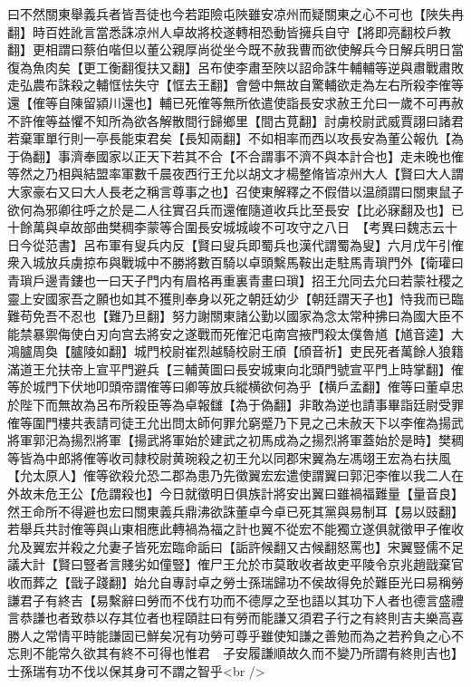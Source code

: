 曰不然關東舉義兵者皆吾徒也今若距險屯陜雖安凉州而疑關東之心不可也【陜失冉翻】時百姓訛言當悉誅凉州人卓故將校遂轉相恐動皆擁兵自守【將即亮翻校戶教翻】更相謂曰蔡伯喈但以董公親厚尚從坐今既不赦我曹而欲使解兵今日解兵明日當復為魚肉矣【更工衡翻復扶又翻】呂布使李肅至陜以詔命誅牛輔輔等逆與肅戰肅敗走弘農布誅殺之輔恇怯失守【恇去王翻】會營中無故自驚輔欲走為左右所殺李傕等還【傕等自陳留潁川還也】輔已死傕等無所依遣使詣長安求赦王允曰一歲不可再赦不許傕等益懼不知所為欲各解散間行歸鄉里【間古莧翻】討虜校尉武威賈詡曰諸君若棄軍單行則一亭長能束君矣【長知兩翻】不如相率而西以攻長安為董公報仇【為于偽翻】事濟奉國家以正天下若其不合【不合謂事不濟不與本計合也】走未晚也傕等然之乃相與結盟率軍數千晨夜西行王允以胡文才楊整脩皆凉州大人【賢曰大人謂大家豪右又曰大人長老之稱言尊事之也】召使東解釋之不假借以温顔謂曰關東鼠子欲何為邪卿往呼之於是二人往實召兵而還傕隨道收兵比至長安【比必寐翻及也】已十餘萬與卓故部曲樊稠李蒙等合圍長安城城峻不可攻守之八日　【考異曰魏志云十日今從范書】呂布軍有叟兵内反【賢曰叟兵即蜀兵也漢代謂蜀為叟】六月戊午引傕衆入城放兵虜掠布與戰城中不勝將數百騎以卓頭繫馬鞍出走駐馬青瑣門外【衛瓘曰青瑣戶邊青鏤也一曰天子門内有眉格再重裏青畫曰瑣】招王允同去允曰若蒙社稷之靈上安國家吾之願也如其不獲則奉身以死之朝廷幼少【朝廷謂天子也】恃我而已臨難苟免吾不忍也【難乃旦翻】努力謝關東諸公勤以國家為念太常种拂曰為國大臣不能禁暴禦侮使白刃向宫去將安之遂戰而死傕汜屯南宫掖門殺太僕魯馗【馗音逵】大鴻臚周奐【臚陵如翻】城門校尉崔烈越騎校尉王頎【頎音祈】吏民死者萬餘人狼籍滿道王允扶帝上宣平門避兵【三輔黄圖曰長安城東向北頭門號宣平門上時掌翻】傕等於城門下伏地叩頭帝謂傕等曰卿等放兵縱横欲何為乎【横戶孟翻】傕等曰董卓忠於陛下而無故為呂布所殺臣等為卓報讎【為于偽翻】非敢為逆也請事畢詣廷尉受罪傕等圍門樓共表請司徒王允出問太師何罪允窮蹙乃下見之己未赦天下以李傕為揚武將軍郭汜為揚烈將軍【揚武將軍始於建武之初馬成為之揚烈將軍蓋始於是時】樊稠等皆為中郎將傕等收司隸校尉黄琬殺之初王允以同郡宋翼為左馮翊王宏為右扶風【允太原人】傕等欲殺允恐二郡為患乃先徵翼宏宏遣使謂翼曰郭汜李傕以我二人在外故未危王公【危謂殺也】今日就徵明日俱族計將安出翼曰雖禍福難量【量音良】然王命所不得避也宏曰關東義兵鼎沸欲誅董卓今卓已死其黨與易制耳【易以豉翻】若舉兵共討傕等與山東相應此轉禍為福之計也翼不從宏不能獨立遂俱就徵甲子傕收允及翼宏并殺之允妻子皆死宏臨命詬曰【詬許候翻又古候翻怒罵也】宋翼豎儒不足議大計【賢曰豎者言賤劣如僮豎】傕尸王允於市莫敢收者故吏平陵令京兆趙戩棄官收而葬之【戩子踐翻】始允自專討卓之勞士孫瑞歸功不侯故得免於難臣光曰易稱勞謙君子有終吉【易繫辭曰勞而不伐冇功而不德厚之至也語以其功下人者也德言盛禮言恭謙也者致恭以存其位者也程頤註曰有勞而能謙又須君子行之有終則吉夫樂高喜勝人之常情平時能謙固已鮮矣况有功勞可尊乎雖使知謙之善勉而為之若矜負之心不忘則不能常久欲其有終不可得也惟君　子安履謙順故久而不變乃所謂有終則吉也】士孫瑞有功不伐以保其身可不謂之智乎<br />
